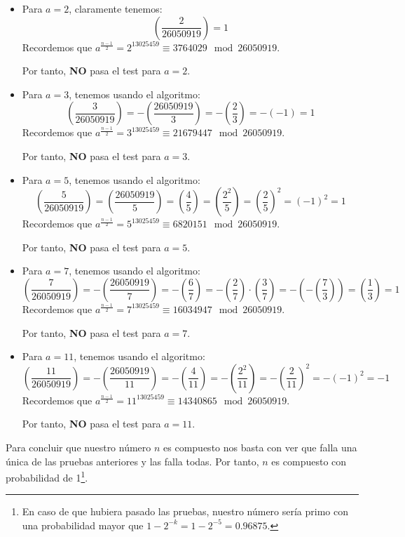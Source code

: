 \begin{enumerate}
		\begin{itemize}
			\item Para $a = 2$, claramente tenemos:
			$$\left(\frac{2}{26050919} \right) = 1$$
			Recordemos que $ a^{\frac{n-1}{2}} = 2^{13025459} \equiv 3764029 \mod 26050919$.
			
			Por tanto, \textbf{NO} pasa el test para $a = 2$.
			
			\item Para $a = 3$, tenemos usando el algoritmo:
			$$\left(\frac{3}{26050919} \right) = -\left(\frac{26050919}{3} \right) = -\left(\frac{2}{3}\right) =
			-(-1) = 1$$
			Recordemos que $ a^{\frac{n-1}{2}} = 3^{13025459} \equiv 21679447 \mod 26050919$.
			
			Por tanto, \textbf{NO} pasa el test para $a = 3$.
			
			\item Para $a = 5$, tenemos usando el algoritmo:
			$$\left(\frac{5}{26050919} \right) = \left(\frac{26050919}{5} \right) =  \left(\frac{4}{5} \right) =
			\left(\frac{2^2}{5} \right) = \left(\frac{2}{5} \right)^2 = (-1)^2 = 1$$
			Recordemos que $ a^{\frac{n-1}{2}} = 5^{13025459} \equiv 6820151 \mod 26050919$.
			
			Por tanto, \textbf{NO} pasa el test para $a = 5$.
			
			\item Para $a = 7$, tenemos usando el algoritmo:
			$$\left(\frac{7}{26050919} \right) = -\left(\frac{26050919}{7} \right) = -\left(\frac{6}{7} \right) =
			-\left(\frac{2}{7} \right) \cdot \left(\frac{3}{7} \right) = -\left(-\left(\frac{7}{3} \right) \right)
			= \left(\frac{1}{3} \right) = 1$$
			Recordemos que $ a^{\frac{n-1}{2}} = 7^{13025459} \equiv 16034947 \mod 26050919$.
			
			Por tanto, \textbf{NO} pasa el test para $a = 7$.
			
			\item Para $a = 11$, tenemos usando el algoritmo:
			$$\left(\frac{11}{26050919} \right) = -\left(\frac{26050919}{11} \right) = -\left(\frac{4}{11} \right)
			= -\left(\frac{2^2}{11} \right) = -\left(\frac{2}{11} \right)^2 = -(-1)^2 = -1$$
			Recordemos que $ a^{\frac{n-1}{2}} = 11^{13025459} \equiv 14340865 \mod 26050919$.
			
			Por tanto, \textbf{NO} pasa el test para $a = 11$.		
		\end{itemize}
		
		Para concluir que nuestro número $n$ es compuesto nos basta con ver que falla una única de las pruebas
		anteriores y las falla todas. Por tanto, $n$ es compuesto con probabilidad de 1\footnote{En caso de que
		hubiera pasado las pruebas, nuestro número sería primo con una probabilidad mayor que $1-2^{-k} =
		1-2^{-5} = 0.96875$.}.
		
	\end{enumerate}
